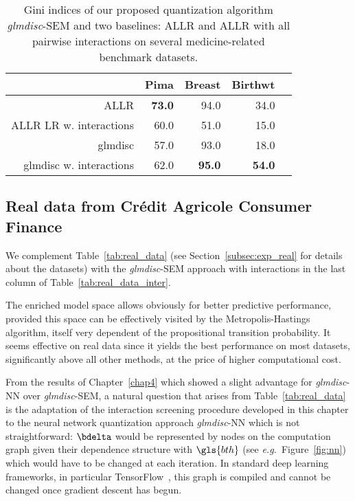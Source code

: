 \begin{table}[t]
\begin{center}
\caption{Gini indices of our proposed quantization algorithm \textit{glmdisc}-SEM and two baselines: ALLR and ALLR with all pairwise interactions on several medicine-related benchmark datasets.}
\label{tab:banchmark_medicine}
\begin{adjustbox}{max width=0.99\textwidth}
\begin{tabular}{rrrrr}
 & Pima & Breast & Birthwt \\ 
  \hline
ALLR & {\textbf{73.0}} & 94.0 & 34.0 \\ 
ALLR LR w. interactions & 60.0 & 51.0 & 15.0 \\ 
glmdisc & 57.0 & 93.0 & 18.0 \\ 
glmdisc w. interactions & 62.0 & {\textbf{95.0}} & {\textbf{54.0}} \\ 
\end{tabular}
\end{adjustbox}
\end{center}
\end{table}


\subsection{Real data from Crédit Agricole Consumer Finance}

We complement Table~\ref{tab:real_data} (see Section~\ref{subsec:exp_real} for details about the datasets) with the \textit{glmdisc}-SEM approach with interactions in the last column of Table~\ref{tab:real_data_inter}.

The enriched model space allows obviously for better predictive performance, provided this space can be effectively visited by the Metropolis-Hastings algorithm, itself very dependent of the propositional transition probability. It seems effective on real data since it yields the best performance on most datasets, significantly above all other methods, at the price of higher computational cost.

From the results of Chapter~\ref{chap4} which showed a slight advantage for \textit{glmdisc}-NN over \textit{glmdisc}-SEM, a natural question that arises from Table~\ref{tab:real_data} is the adaptation of the interaction screening procedure developed in this chapter to the neural network quantization approach \textit{glmdisc}-NN which is not straightforward: $\bdelta$ would be represented by nodes on the computation graph given their dependence structure with $\gls{bth}$ (see \textit{e.g.}\ Figure~\ref{fig:nn}) which would have to be changed at each iteration. In standard deep learning frameworks, in particular TensorFlow~\cite{tensorflow2015-whitepaper}, this graph is compiled and cannot be changed once gradient descent has begun.

